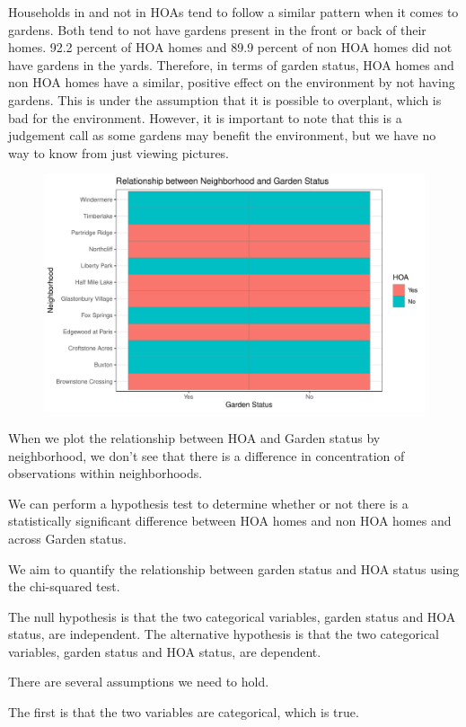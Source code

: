 \documentclass{article}
\begin{document}
Households in and not in HOAs tend to follow a similar pattern when it comes to gardens. Both tend to not have gardens present in the front or back of their homes. 92.2 percent of HOA homes and 89.9 percent of non HOA homes did not have gardens in the yards. Therefore, in terms of garden status, HOA homes and non HOA homes have a similar, positive effect on the environment by not having gardens. This is under the assumption that it is possible to overplant, which is bad for the environment. However, it is important to note that this is a judgement call as some gardens may benefit the environment, but we have no way to know from just viewing pictures.
\begin{figure}[H]
		\centering
\includegraphics{exam23-028}
		\label{Fig:plot10}
	\end{figure}
When we plot the relationship between HOA and Garden status by neighborhood, we don't see that there is a difference in concentration of observations within neighborhoods. 

We can perform a hypothesis test to determine whether or not there is a statistically significant difference between HOA homes and non HOA homes and across Garden status. 

We aim to quantify the relationship between garden status and HOA status using the chi-squared test.

The null hypothesis is that the two categorical variables, garden status and HOA status, are independent.
The alternative hypothesis is that the two categorical variables, garden status and HOA status, are dependent. 

There are several assumptions we need to hold. 

The first is that the two variables are categorical, which is true.
\end{document}
